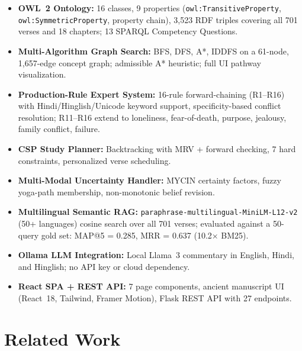 \documentclass[conference]{IEEEtran}
\begin{document}
\begin{itemize}[leftmargin=*]
  \item \textbf{OWL~2 Ontology:} 16 classes, 9 properties (\texttt{owl:TransitiveProperty},
        \texttt{owl:SymmetricProperty}, property chain), 3,523 RDF triples covering
        all 701 verses and 18 chapters; 13 SPARQL Competency Questions.

  \item \textbf{Multi-Algorithm Graph Search:} BFS, DFS, A*, IDDFS on a
        61-node, 1,657-edge concept graph; admissible A* heuristic;
        full UI pathway visualization.

  \item \textbf{Production-Rule Expert System:} 16-rule forward-chaining
        (R1--R16) with Hindi/Hinglish/Unicode keyword support, specificity-based
        conflict resolution; R11--R16 extend to loneliness, fear-of-death,
        purpose, jealousy, family conflict, failure.

  \item \textbf{CSP Study Planner:} Backtracking with MRV + forward checking,
        7 hard constraints, personalized verse scheduling.

  \item \textbf{Multi-Modal Uncertainty Handler:} MYCIN certainty factors,
        fuzzy yoga-path membership, non-monotonic belief revision.

  \item \textbf{Multilingual Semantic RAG:} \texttt{paraphrase-multilingual-MiniLM-L12-v2}
        (50+ languages) cosine search over all 701 verses; evaluated against
        a 50-query gold set: MAP@5 = 0.285, MRR = 0.637 (10.2$\times$ BM25).

  \item \textbf{Ollama LLM Integration:} Local Llama~3 commentary in English,
        Hindi, and Hinglish; no API key or cloud dependency.

  \item \textbf{React SPA + REST API:} 7 page components, ancient manuscript UI
        (React~18, Tailwind, Framer Motion), Flask REST API with 27 endpoints.
\end{itemize}

\section{Related Work}
\end{document}
